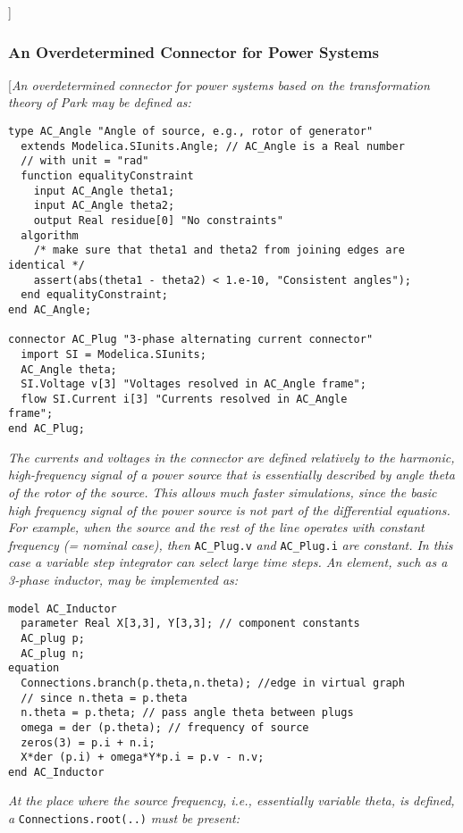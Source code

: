 {]}

\subsubsection{An Overdetermined Connector for Power Systems}

{[}\emph{An overdetermined connector for power systems based on the
transformation theory of Park may be defined as:}

\begin{lstlisting}[language=modelica]
type AC_Angle "Angle of source, e.g., rotor of generator"
  extends Modelica.SIunits.Angle; // AC_Angle is a Real number
  // with unit = "rad"
  function equalityConstraint
    input AC_Angle theta1;
    input AC_Angle theta2;
    output Real residue[0] "No constraints"
  algorithm
    /* make sure that theta1 and theta2 from joining edges are identical */
    assert(abs(theta1 - theta2) < 1.e-10, "Consistent angles");
  end equalityConstraint;
end AC_Angle;

connector AC_Plug "3-phase alternating current connector"
  import SI = Modelica.SIunits;
  AC_Angle theta;
  SI.Voltage v[3] "Voltages resolved in AC_Angle frame";
  flow SI.Current i[3] "Currents resolved in AC_Angle
frame";
end AC_Plug;
\end{lstlisting}
\emph{The currents and voltages in the connector are defined relatively
to the harmonic, high-frequency signal of a power source that is
essentially described by angle theta of the rotor of the source. This
allows much faster simulations, since the basic high frequency signal of
the power source is not part of the differential equations. For example,
when the source and the rest of the line operates with constant
frequency (= nominal case), then} \lstinline!AC_Plug.v! \emph{and} \lstinline!AC_Plug.i!
\emph{are constant. In this case a variable step integrator can select
large time steps. An element, such as a 3-phase inductor, may be
implemented as:}

\begin{lstlisting}[language=modelica]
model AC_Inductor
  parameter Real X[3,3], Y[3,3]; // component constants
  AC_plug p;
  AC_plug n;
equation
  Connections.branch(p.theta,n.theta); //edge in virtual graph
  // since n.theta = p.theta
  n.theta = p.theta; // pass angle theta between plugs
  omega = der (p.theta); // frequency of source
  zeros(3) = p.i + n.i;
  X*der (p.i) + omega*Y*p.i = p.v - n.v;
end AC_Inductor
\end{lstlisting}
\emph{At the place where the source frequency, i.e., essentially
variable theta, is defined, a} \lstinline!Connections.root(..)! \emph{must be
present:}

